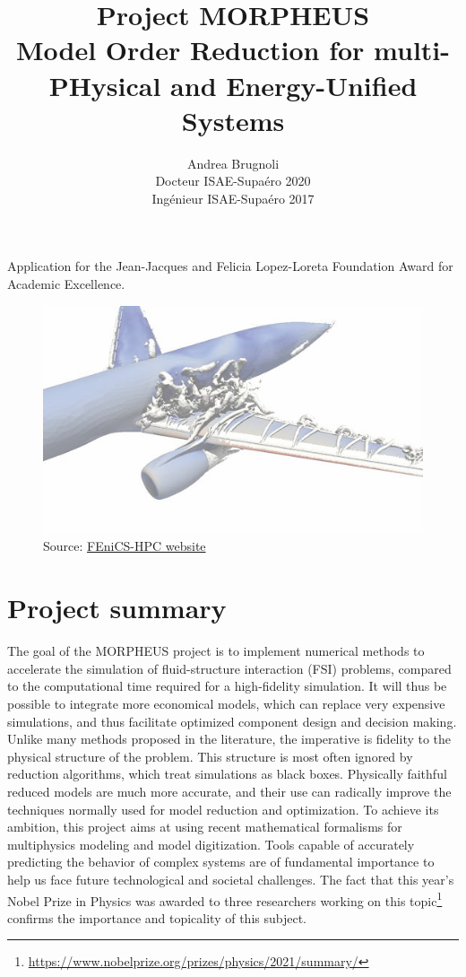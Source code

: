 \documentclass[12pt]{article}
\author{Andrea Brugnoli \\ 
	\hspace{2.8pt} Docteur ISAE-Supaéro 2020\\
	Ingénieur ISAE-Supaéro 2017}
\title{Project MORPHEUS \\
	\vspace{.3cm}
	\Large{Model Order Reduction for multi-PHysical and Energy-Unified Systems}  }
\date{}
\begin{document}
	
	\maketitle
	
	\large{Application for the Jean-Jacques and Felicia Lopez-Loreta Foundation Award for Academic Excellence.}
	
	
	\begin{figure}[h]
		\centering
		\includegraphics[width=.95\textwidth]{3Dplane.jpg}
		\captionsetup{labelformat=empty}
		\caption{Source: \href{http://www.fenics-hpc.org/}{FEniCS-HPC website}}
	\end{figure}
	
	
	
	
	
	\thispagestyle{empty}
	
	\newpage
	
	\section{Project summary}
	
	The goal of the MORPHEUS project is to implement numerical methods 	to accelerate the simulation of fluid-structure interaction (FSI) problems, compared to the computational time required for a high-fidelity simulation. It will thus be possible to integrate more economical models, which can replace very expensive simulations, and thus facilitate optimized component design and decision making. Unlike many methods proposed in the literature, the imperative is fidelity to the physical structure of the problem.  This structure is most often ignored by reduction algorithms, which treat simulations as black boxes. Physically faithful reduced models are much more accurate, and their use can radically improve the techniques normally used for model reduction and optimization. To achieve its ambition, this project aims at using recent mathematical formalisms for multiphysics modeling and model digitization. Tools capable of accurately predicting the behavior of complex systems are of fundamental importance to help us face future technological and societal challenges. The fact that this year's Nobel Prize in Physics was awarded to three researchers working on this topic\footnote{\url{https://www.nobelprize.org/prizes/physics/2021/summary/}} confirms the importance and topicality of this subject.
\end{document}
